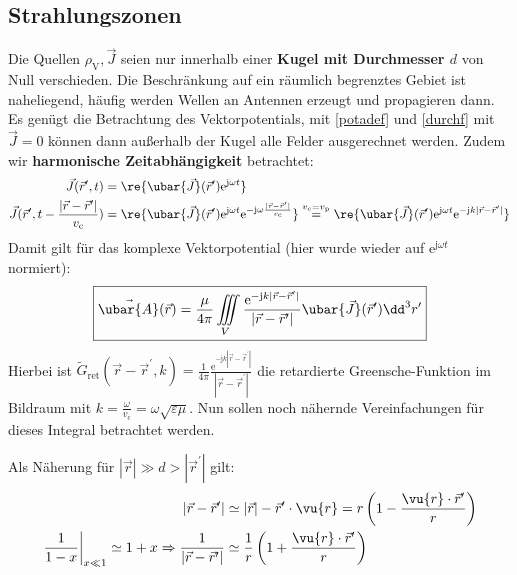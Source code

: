   \subsection{Strahlungszonen}\label{strahlungszonen}
	   Die Quellen \(\rho_\text{V}, \vec{J}\) seien nur innerhalb einer \textbf{Kugel mit Durchmesser \(d\)} von Null verschieden. Die Beschränkung auf ein räumlich begrenztes Gebiet ist naheliegend, häufig werden Wellen an Antennen erzeugt und propagieren dann. Es genügt die Betrachtung des Vektorpotentials, mit \ref{potadef} und \ref{durchf} mit $\vec{J}=0$ können dann außerhalb der Kugel alle Felder ausgerechnet werden. Zudem wir \textbf{harmonische Zeitabhängigkeit} betrachtet:
		        \begin{equation}\begin{split}
				        \vec{J} (\vec{r}^\prime , t) &= \re{\ubar{\vec{J}}(\vec{r}^\prime ) \mathrm{e}^{\mathrm{j}\omega t}} \\
				        \vec{J} (\vec{r}^\prime , t-\frac{|\vec{r} -\vec{r}^\prime |}{ v_\mathrm{c}}) &= \re{\ubar{\vec{J}}(\vec{r}^\prime ) \mathrm{e}^{\mathrm{j}\omega t} \mathrm{e}^{-\mathrm{j}\omega \frac{|\vec{r} -\vec{r}^\prime |}{ v_\mathrm{c}}}} \stackrel{v_\mathrm{c}=v_\mathrm{p}}{=} \re{\ubar{\vec{J}}(\vec{r}^\prime ) \mathrm{e}^{\mathrm{j}\omega t} \mathrm{e}^{-\mathrm{j} k |\vec{r} -\vec{r}^\prime |}}
			        \end{split}\end{equation}
		  Damit gilt für das komplexe Vektorpotential (hier wurde wieder auf $\mathrm{e}^{\mathrm{j}\omega t}$ normiert):
		        \begin{equation}\label{kompvekpot}
			        \boxed{%
			        \vec{\ubar{A}} (\vec{r} ) = \frac{\mu}{4\pi} \iiint\limits_V \frac{ \mathrm{e}^{-\mathrm{j} k |\vec{r} -\vec{r}^\prime |}}{|\vec{r} -\vec{r}^\prime |} \ubar{\vec{J}}(\vec{r}^\prime ) \dd^3  r^\prime}
		        \end{equation}
		   Hierbei ist
		        \(\tilde{G}_\mathrm{ret}(\vec{r} -\vec{r}^\prime ,  k) = \frac{1}{4\pi} \frac{ \mathrm{e}^{-\mathrm{j} k |\vec{r} -\vec{r}^\prime |}}{|\vec{r} -\vec{r}^\prime |}\)
		        die retardierte Greensche-Funktion im Bildraum mit \( k = \frac{\omega}{ v_\mathrm{c}} = \omega\sqrt{\varepsilon\mu}\). Nun sollen noch nähernde Vereinfachungen für dieses Integral betrachtet werden.
	  \begin{center}
		  
	  \end{center}
		  Als Näherung für \(|\vec{r} | \gg d > |\vec{r}^\prime |\) gilt:
		        \begin{equation}\begin{split}
				        |\vec{r}  - \vec{r}^\prime | &\simeq |\vec{r} | - \vec{r}^\prime \cdot\vu{r} = r \left(1 - \frac{\vu{r}\cdot \vec{r}^\prime }{r} \right)\\
				       \left.\frac{1}{1-x}\right|_{x \ll 1}\simeq 1+x \Rightarrow \frac{1}{|\vec{r}  - \vec{r}^\prime |} &\simeq \frac{1}{r} \left( 1 +\frac{\vu{r}\cdot \vec{r}^\prime }{r} \right)
			        \end{split}\end{equation}
